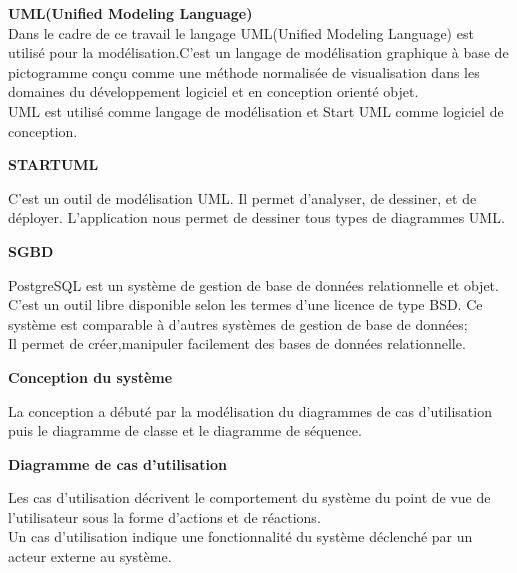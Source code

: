\documentclass[12pt, openany]{report}
\begin{document}
\textbf{UML(Unified Modeling Language) }\\
Dans le cadre de ce travail le langage UML(Unified Modeling Language) est utilisé pour la modélisation.C’est un langage de modélisation graphique à base de pictogramme conçu comme une méthode normalisée de visualisation dans les domaines du développement logiciel et en conception orienté objet.\\
 UML est utilisé comme langage de modélisation et Start UML comme logiciel de conception.\\
    \begin{center}
\textbf{STARTUML }\\
\end{center}
C’est un outil de modélisation UML. Il permet d'analyser, de dessiner, et de déployer. L'application nous permet de dessiner tous types de diagrammes UML.\\ 
 \begin{center}
\textbf{SGBD }\\ 
\end{center} 
PostgreSQL est un système de gestion de base de données relationnelle et objet. C'est un outil libre disponible selon les termes d'une licence de type BSD. Ce système est comparable à d'autres systèmes de gestion de base de données;\\
Il permet de créer,manipuler facilement des bases de données relationnelle.\\
\begin{center}
\textbf{Conception du système}\\
\end{center}
La conception a débuté par la modélisation du diagrammes de cas d’utilisation puis le diagramme de classe et le diagramme de séquence.\\
\begin{center}
\textbf{Diagramme de cas d’utilisation}\\
\end{center}
Les cas d’utilisation décrivent le comportement du système du point de vue de l’utilisateur sous la forme d’actions et de réactions. \\
Un cas d’utilisation indique une fonctionnalité du système déclenché par un acteur externe au système.\\
\end{document}
